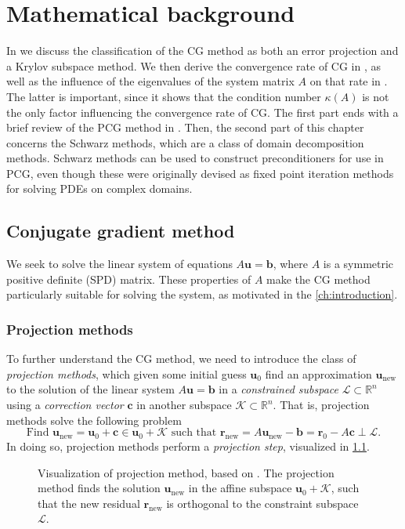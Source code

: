 \chapter{Mathematical background}\label{ch:background}
In  we discuss the classification of the CG method as both an error projection and a Krylov subspace method. We then derive the convergence rate of CG in , as well as the influence of the eigenvalues of the system matrix $A$ on that rate in . The latter is important, since it shows that the condition number $\kappa(A)$ is not the only factor influencing the convergence rate of CG. The first part ends with a brief review of the PCG method in . Then, the second part of this chapter  concerns the Schwarz methods, which are a class of domain decomposition methods. Schwarz methods can be used to construct preconditioners for use in PCG, even though these were originally devised as fixed point iteration methods for solving PDEs on complex domains.

\section{Conjugate gradient method}\label{sec:cg_method}
We seek to solve the linear system of equations $A\mathbf{u} = \mathbf{b}$, where $A$ is a symmetric positive definite (SPD) matrix. These properties of $A$ make the CG method particularly suitable for solving the system, as motivated in the \cref{ch:introduction}.

\subsection{Projection methods}
To further understand the CG method, we need to introduce the class of \textit{projection methods}, which given some initial guess $\mathbf{u}_0$ find an approximation $\mathbf{u}_{\text{new}}$ to the solution of the linear system $A\mathbf{u} = \mathbf{b}$ in a \textit{constrained subspace} $\mathcal{L}\subset\mathbb{R}^n$ using a \textit{correction vector} $\mathbf{c}$ in another subspace $\mathcal{K}\subset\mathbb{R}^n$. That is, projection methods solve the following problem \cite[Equation 5.3]{iter_method_saad}
\[
  \text{Find } \mathbf{u}_{\text{new}} = \mathbf{u}_0 + \mathbf{c} \in \mathbf{u}_0 + \mathcal{K} \text{ such that } \mathbf{r}_{\text{new}} =  A\mathbf{u}_{\text{new}} - \mathbf{b} = \mathbf{r}_0 - A\mathbf{c} \perp \mathcal{L}.
\]
In doing so, projection methods perform a \textit{projection step}, visualized in \cref{fig:projection_method}.
\begin{figure}[H]
  \centering
  
  \caption{Visualization of projection method, based on \cite[Figure 5.1]{iter_method_saad}. The projection method finds the solution $\mathbf{u}_{\text{new}}$ in the affine subspace $\mathbf{u}_0 + \mathcal{K}$, such that the new residual $\mathbf{r}_{\text{new}}$ is orthogonal to the constraint subspace $\mathcal{L}$.}
  \label{fig:projection_method}
\end{figure}

